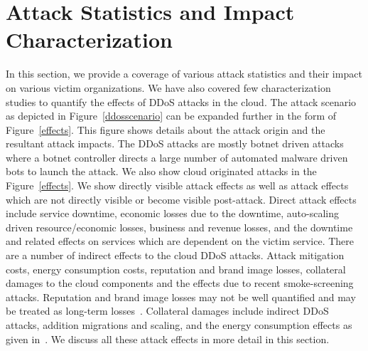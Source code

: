 \documentclass[final,5p,times,twocolumn]{elsarticle}
\begin{document}
\section{Attack Statistics and Impact Characterization}
\label{AttackStatistics}
In this section, we provide a coverage of various attack statistics and their impact on various victim organizations. We have also covered few characterization studies to quantify the effects of DDoS attacks in the cloud. {The attack scenario as depicted in Figure~\ref{ddosscenario} can be expanded further in the form of Figure~\ref{effects}. This figure shows details about the attack origin and the resultant attack impacts. The DDoS attacks are mostly botnet driven attacks where a botnet controller directs a large number of automated malware driven bots to launch the attack. We also show cloud originated attacks in the Figure~\ref{effects}. We show directly visible attack effects as well as attack effects which are not directly visible or become visible post-attack. Direct attack effects include service downtime, economic losses due to the downtime, auto-scaling driven resource/economic losses, business and revenue losses, and the downtime and related effects on services which are dependent on the victim service. There are a number of indirect effects to the cloud DDoS attacks. Attack mitigation costs, energy consumption costs, reputation and brand image losses, collateral damages to the cloud components and the effects due to recent smoke-screening attacks. Reputation and brand image losses may not be well quantified and may be treated as long-term losses~\cite{conversion}. Collateral damages include indirect DDoS attacks, addition migrations and scaling, and the energy consumption effects as given in~\cite{somani2016ddos}. We discuss all these attack effects in more detail in this section. }
\end{document}
